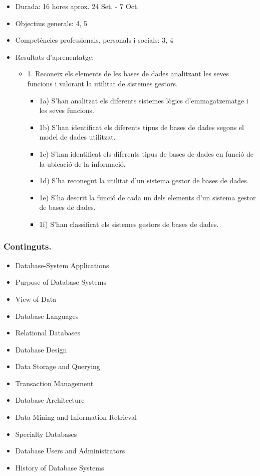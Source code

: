 \documentclass[catalan, a4paper, 12pt, titlepage]{article}
\begin{document}
  \begin{itemize}
	\item Durada: 16 hores aprox. 24 Set. - 7 Oct.
	\item Objectius generals: 4, 5
	\item Competències professionals, personals i socials: 3, 4
	\item Resultats d'aprenentatge: 
		\begin{itemize}
			\item 1. Reconeix els elements de les bases de dades analitzant les seves funcions i valorant la utilitat de sistemes gestors.
				\begin{itemize}
					\item 1a) S'han analitzat els diferents sistemes lògics d'emmagatzematge i les seves funcions.
					\item 1b) S'han identificat els diferents tipus de bases de dades segons el model de dades utilitzat.
					\item 1c) S'han identificat els diferents tipus de bases de dades en funció de la ubicació de la informació.
					\item 1d) S'ha reconegut la utilitat d'un sistema gestor de bases de dades.
					\item 1e) S'ha descrit la funció de cada un dels elements d'un sistema gestor de bases de dades.
					\item 1f) S'han classificat els sistemes gestors de bases de dades.
				\end{itemize}
		\end{itemize}
  \end{itemize}

  
  \subsubsection{Continguts.}

  \begin{itemize}
	  \item Database-System Applications
	  \item Purpose of Database Systems
	  \item View of Data
	  \item Database Languages
	  \item Relational Databases
	  \item Database Design
	  \item Data Storage and Querying
	  \item Transaction Management
	  \item Database Architecture
	  \item Data Mining and Information Retrieval
	  \item Specialty Databases
	  \item Database Users and Administrators
	  \item History of Database Systems
  \end{itemize}
  
\end{document}
